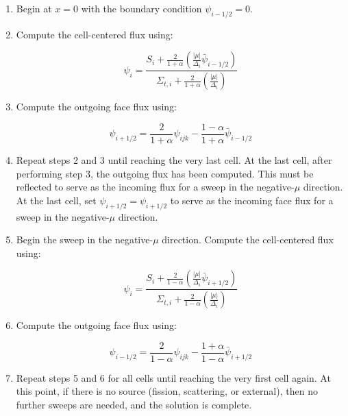 \documentclass[10pt]{article}
\begin{document}
\begin{enumerate}
\item Begin at \(x=0\) with the boundary condition \(\psi_{i-1/2}=0\). 
\item Compute the cell-centered flux using:

\begin{equation}
\psi_{i}=\frac{S_{i}+\frac{2}{1+\alpha}\left(\frac{|\mu|}{\Delta_i}\bar{\psi}_{i-1/2}\right)}{\Sigma_{t,i}+\frac{2}{1+\alpha}\left(\frac{|\mu|}{\Delta_i}\right)}
\end{equation}

\item Compute the outgoing face flux using:

\begin{equation}
\psi_{i+1/2}=\frac{2}{1+\alpha}\psi_{ijk}-\frac{1-\alpha}{1+\alpha}\bar{\psi}_{i-1/2}
\end{equation}

\item Repeat steps 2 and 3 until reaching the very last cell. At the last cell, after performing step 3, the outgoing flux has been computed. This must be reflected to serve as the incoming flux for a sweep in the negative-\(\mu\) direction. At the last cell, set \(\psi_{i+1/2}=\psi_{i+1/2}\) to serve as the incoming face flux for a sweep in the negative-\(\mu\) direction.

\item Begin the sweep in the negative-\(\mu\) direction. Compute the cell-centered flux using:

\begin{equation}
\psi_{i}=\frac{S_{i}+\frac{2}{1-\alpha}\left(\frac{|\mu|}{\Delta_i}\bar{\psi}_{i+1/2}\right)}{\Sigma_{t,i}+\frac{2}{1-\alpha}\left(\frac{|\mu|}{\Delta_i}\right)}
\end{equation}

\item Compute the outgoing face flux using:

\begin{equation}
\psi_{i-1/2}=\frac{2}{1-\alpha}\psi_{ijk}-\frac{1+\alpha}{1-\alpha}\bar{\psi}_{i+1/2}
\end{equation}

\item Repeat steps 5 and 6 for all cells until reaching the very first cell again. At this point, if there is no source (fission, scattering, or external), then no further sweeps are needed, and the solution is complete.
\end{enumerate}
\end{document}
